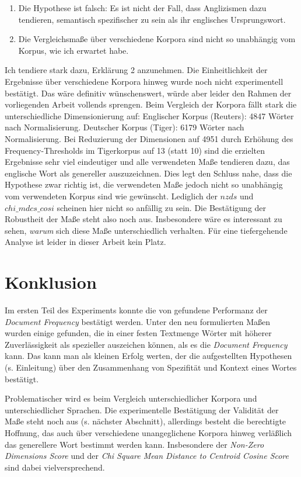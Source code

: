 \documentclass[11pt,numbers=noenddot]{scrartcl}
\begin{document}
\begin{enumerate}
    \item Die Hypothese ist falsch: Es ist nicht der Fall, dass Anglizismen dazu tendieren, semantisch spezifischer zu sein als ihr englisches Ursprungswort.
    \item Die Vergleichsmaße über verschiedene Korpora sind nicht so unabhängig vom Korpus, wie ich erwartet habe.
\end{enumerate}
Ich tendiere stark dazu, Erklärung 2 anzunehmen. Die Einheitlichkeit der Ergebnisse über verschiedene Korpora hinweg wurde noch nicht experimentell bestätigt. Das wäre definitiv wünschenswert, würde aber leider den Rahmen der vorliegenden Arbeit vollends sprengen. Beim Vergleich der Korpora fällt stark die unterschiedliche Dimensionierung auf: Englischer Korpus (Reuters): 4847 Wörter nach Normalisierung. Deutscher Korpus (Tiger): 6179 Wörter nach Normalisierung. Bei Reduzierung der Dimensionen auf 4951 durch Erhöhung des Frequency-Thresholds im Tigerkorpus auf 13 (statt 10) sind die erzielten Ergebnisse sehr viel eindeutiger und alle verwendeten Maße tendieren dazu, das englische Wort als genereller auszuzeichnen. Dies legt den Schluss nahe, dass die Hypothese zwar richtig ist, die verwendeten Maße jedoch nicht so unabhängig vom verwendeten Korpus sind wie gewünscht. Lediglich der $nzds$ und $chi\_mdcs\_cosi$ scheinen hier nicht so anfällig zu sein. Die Bestätigung der Robustheit der Maße steht also noch aus. Insbesondere wäre es interessant zu sehen, \emph{warum} sich diese Maße unterschiedlich verhalten. Für eine tiefergehende Analyse ist leider in dieser Arbeit kein Platz.

\section{Konklusion}

Im ersten Teil des Experiments konnte die von \citet{Caraballo99determiningthe} gefundene Performanz der \emph{Document Frequency} bestätigt werden. Unter den neu formulierten Maßen wurden einige gefunden, die in einer festen Textmenge Wörter mit höherer Zuverlässigkeit als spezieller auszeichen können, als es die \emph{Document Frequency} kann. Das kann man als kleinen Erfolg werten, der die aufgestellten Hypothesen (s. Einleitung) über den Zusammenhang von Spezifität und Kontext eines Wortes bestätigt.

Problematischer wird es beim Vergleich unterschiedlicher Korpora und unterschiedlicher Sprachen. Die experimentelle Bestätigung der Validität der Maße steht noch aus (s. nächster Abschnitt), allerdings besteht die berechtigte Hoffnung, das auch über verschiedene unangeglichene Korpora hinweg verläßlich das generellere Wort bestimmt werden kann. Insbesondere der \emph{Non-Zero Dimensions Score} und der \emph{Chi Square Mean Distance to Centroid Cosine Score} sind dabei vielversprechend.
\end{document}
